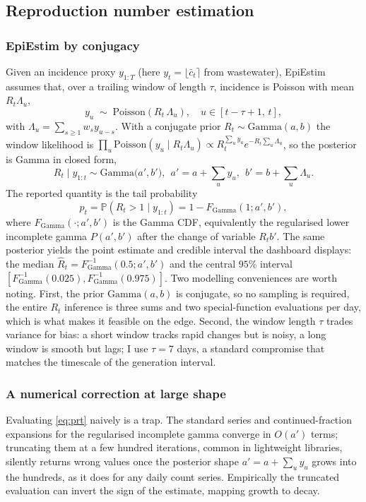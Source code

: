 \documentclass[10pt,twocolumn]{article}
\theoremstyle{definition}
\newcommand{\Rt}{R_t}
\newcommand{\Prob}{\mathbb{P}}
\newcommand{\Pois}{\mathrm{Poisson}}
\newcommand{\Gam}{\mathrm{Gamma}}
\begin{document}
\subsection{Reproduction number estimation}
\label{sec:rt}

\subsubsection{EpiEstim by conjugacy}
Given an incidence proxy $y_{1:T}$ (here $y_t=\lfloor\bar c_t\rceil$ from
wastewater), EpiEstim \citep{cori2013} assumes that, over a trailing window of
length $\tau$, incidence is Poisson with mean $\Rt\Lambda_u$,
\begin{equation}
y_u \;\sim\; \Pois(\Rt\,\Lambda_u),\quad u\in[t-\tau+1,\,t],
\end{equation}
with $\Lambda_u=\sum_{s\ge1}w_s y_{u-s}$. With a conjugate prior
$\Rt\sim\Gam(a,b)$ the window likelihood is
$\prod_u \Pois(y_u\mid\Rt\Lambda_u)\propto \Rt^{\sum_u y_u}e^{-\Rt\sum_u\Lambda_u}$,
so the posterior is Gamma in closed form,
\begin{equation}
\Rt\mid y_{1:t} \sim \Gam\big(a',b'\big),\ \
a'=a+\!\textstyle\sum_{u}y_u,\ \ b'=b+\!\textstyle\sum_u\Lambda_u.
\label{eq:epiestim}
\end{equation}
The reported quantity is the tail probability
\begin{equation}
p_t=\Prob(\Rt>1\mid y_{1:t})=1-F_{\Gam}(1;a',b'),
\label{eq:prt}
\end{equation}
where $F_{\Gam}(\cdot;a',b')$ is the Gamma CDF, equivalently the regularised lower
incomplete gamma $P(a',b')$ after the change of variable $\Rt b'$. The same
posterior yields the point estimate and credible interval the dashboard displays:
the median $\hat R_t=F_{\Gam}^{-1}(0.5;a',b')$ and the central $95\%$ interval
$[F_{\Gam}^{-1}(0.025),F_{\Gam}^{-1}(0.975)]$. Two modelling conveniences are
worth noting. First, the prior $\Gam(a,b)$ is conjugate, so no sampling is
required, the entire $\Rt$ inference is three sums and two special-function
evaluations per day, which is what makes it feasible on the edge. Second, the
window length $\tau$ trades variance for bias: a short window tracks rapid changes
but is noisy, a long window is smooth but lags; I use $\tau=7$ days, a standard
compromise that matches the timescale of the generation interval.

\subsubsection{A numerical correction at large shape}
\label{sec:numerical}
Evaluating \eqref{eq:prt} naively is a trap. The standard series and
continued-fraction expansions for the regularised incomplete gamma converge in
$O(a')$ terms; truncating them at a few hundred iterations, common in lightweight
libraries, silently returns wrong values once the posterior shape $a'=a+\sum_u y_u$
grows into the hundreds, as it does for any daily count series. Empirically the
truncated evaluation can invert the sign of the estimate, mapping growth to decay.
\end{document}
